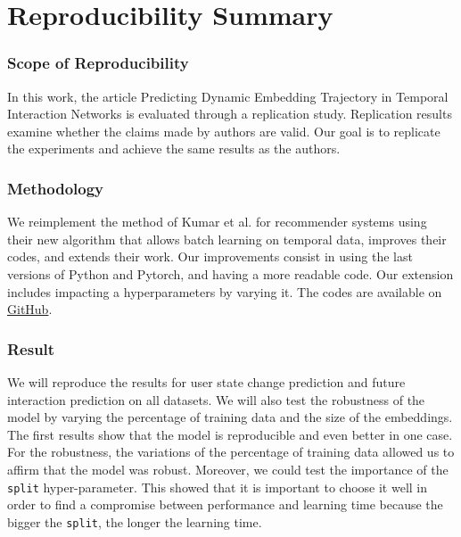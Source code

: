 

\newcommand{\amel}[1]{{\color{orange} #1}} 

\section*{Reproducibility Summary}


\subsubsection{Scope of Reproducibility}

In this work, the article Predicting Dynamic Embedding Trajectory in Temporal Interaction Networks \supercite{kumar2019predicting}  is evaluated through a replication study. Replication results examine whether the claims made by authors are valid. Our goal is to replicate the experiments and achieve the same results as the authors.

\subsubsection{Methodology}

We reimplement the method of Kumar et al.\supercite{kumar2019predicting} for recommender systems using their new algorithm that allows batch learning on temporal data, improves their codes, and extends their work. Our improvements consist in using the last versions of Python and  Pytorch, and having a more readable code. Our extension includes impacting a hyperparameters by varying it. The codes are available on \href{https://github.com/ComplexNetTSP/JODIE}{GitHub}. 

\subsubsection{Result}

We will reproduce the results for user state change prediction and future interaction prediction on all datasets. We will also test the robustness of the model by varying the percentage of training data and the size of the embeddings. The first results show that the model is reproducible and even better in one case. For the robustness, the variations of the percentage of training data allowed us to affirm that the model was robust. Moreover, we could test the importance of the \texttt{split} hyper-parameter. This showed that it is important to choose it well in order to find a compromise between performance and learning time because the bigger the \texttt{split}, the longer the learning time.


